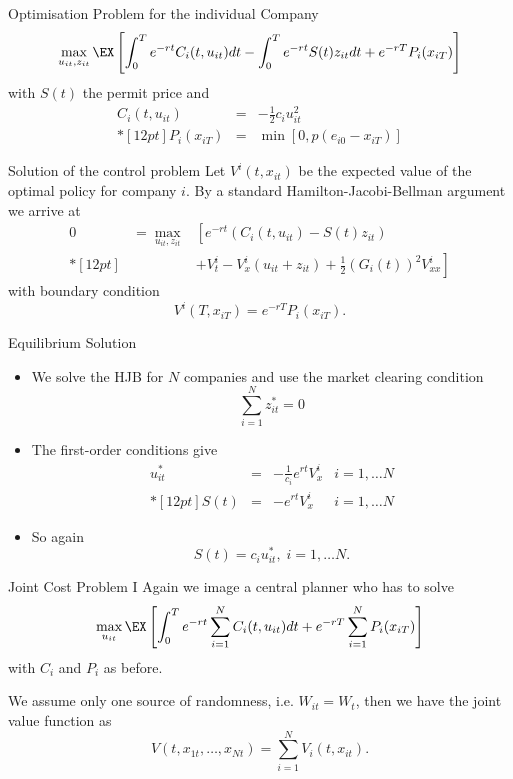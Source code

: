 {Optimisation Problem for the individual Company}
\begin{equation}
\max_{u_{it}, z_{it}} \EX\left[\int_0^Te^{-rt}C_i(t,u_{it})dt - \int_0^T e^{-rt}S(t)z_{it}dt+ e^{-rT}P_i(x_{iT})\right]
\end{equation}
with $S(t)$ the permit price and
$$
\begin{array}{lll}
C_i(t,u_{it}) &=& - \frac{1}{2}c_i u_{it}^2 \\*[12pt]
P_i(x_{iT}) &=& \min[0,p(e_{i0}-x_{iT})]
\end{array}
$$

{Solution of the control problem}
Let $V^i(t,x_{it})$ be the expected value of the optimal policy for company $i$. By a standard
Hamilton-Jacobi-Bellman argument we arrive at
$$
\begin{array}{lll}
0&=\max_{u_{it},z_{it}}&\left[e^{-rt}(C_i(t,u_{it}) - S(t) z_{it})\right.\\*[12pt]
&&+\left.V^i_t -V_x^i(u_{it}+z_{it}) + \frac{1}{2}(G_i(t))^2 V^i_{xx}\right]
\end{array}
$$
with boundary condition
$$
V^i(T, x_{iT})=e^{-rT}P_i(x_{iT}).
$$

{Equilibrium Solution}
\begin{itemize}
\item<1-> We solve the HJB for $N$ companies and use the market clearing condition
$$
\sum_{i=1}^N z_{it}^*=0
$$
\item<2-> The first-order conditions give
$$
\begin{array}{llll}
u_{it}^* &=& -\frac{1}{c_i} e^{rt} V^i_x & i=1, \ldots N \\*[12pt]
S(t) &=& - e^{rt} V^i_{x} & i=1, \ldots N
\end{array}
$$
\item<3-> So again
$$
S(t) = c_i u_{it}^*, \; i=1, \ldots N.
$$
\end{itemize}

{Joint Cost Problem I}
Again we image a central planner who has to solve
\begin{equation}
\max_{u_{it}} \EX\left[\int_0^Te^{-rt}\sum_{i=1}^N C_i(t,u_{it})dt + e^{-rT} \sum_{i=1}^N P_i(x_{iT})\right]
\end{equation}
with $C_i$ and $P_i$ as before.

We assume only one source of randomness, i.e. $W_{it}= W_t$, then we have the  joint value function as
$$
V(t, x_{1t}, \ldots, x_{Nt}) = \sum_{i=1}^N V_i(t,x_{it}).
$$

